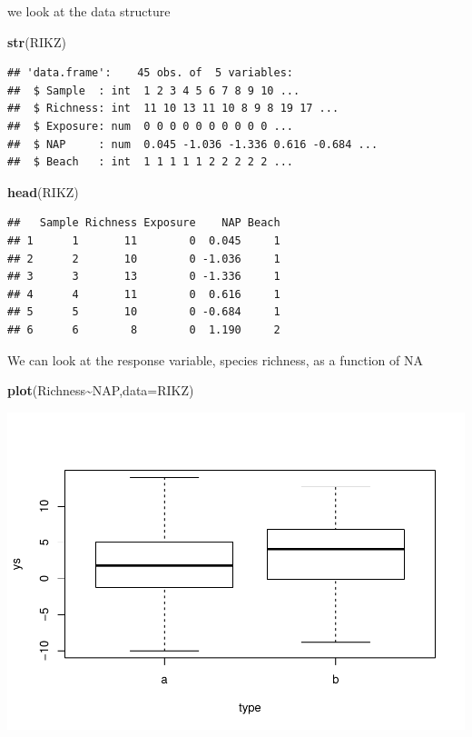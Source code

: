 \documentclass[
]{book}
\newenvironment{Shaded}{\begin{snugshade}}{\end{snugshade}}
\newcommand{\AttributeTok}[1]{\textcolor[rgb]{0.13,0.29,0.53}{#1}}
\newcommand{\FunctionTok}[1]{\textcolor[rgb]{0.13,0.29,0.53}{\textbf{#1}}}
\newcommand{\NormalTok}[1]{#1}
\newcommand{\SpecialCharTok}[1]{\textcolor[rgb]{0.81,0.36,0.00}{\textbf{#1}}}
\begin{document}
we look at the data structure

\begin{Shaded}
\begin{Highlighting}[]
\FunctionTok{str}\NormalTok{(RIKZ)}
\end{Highlighting}
\end{Shaded}

\begin{verbatim}
## 'data.frame':    45 obs. of  5 variables:
##  $ Sample  : int  1 2 3 4 5 6 7 8 9 10 ...
##  $ Richness: int  11 10 13 11 10 8 9 8 19 17 ...
##  $ Exposure: num  0 0 0 0 0 0 0 0 0 0 ...
##  $ NAP     : num  0.045 -1.036 -1.336 0.616 -0.684 ...
##  $ Beach   : int  1 1 1 1 1 2 2 2 2 2 ...
\end{verbatim}

\begin{Shaded}
\begin{Highlighting}[]
\FunctionTok{head}\NormalTok{(RIKZ)}
\end{Highlighting}
\end{Shaded}

\begin{verbatim}
##   Sample Richness Exposure    NAP Beach
## 1      1       11        0  0.045     1
## 2      2       10        0 -1.036     1
## 3      3       13        0 -1.336     1
## 4      4       11        0  0.616     1
## 5      5       10        0 -0.684     1
## 6      6        8        0  1.190     2
\end{verbatim}

We can look at the response variable, species richness, as a function of NA

\begin{Shaded}
\begin{Highlighting}[]
\FunctionTok{plot}\NormalTok{(Richness}\SpecialCharTok{\textasciitilde{}}\NormalTok{NAP,}\AttributeTok{data=}\NormalTok{RIKZ)}
\end{Highlighting}
\end{Shaded}

\includegraphics{ECOMODbook_files/figure-latex/unnamed-chunk-61-1.pdf}
\end{document}
